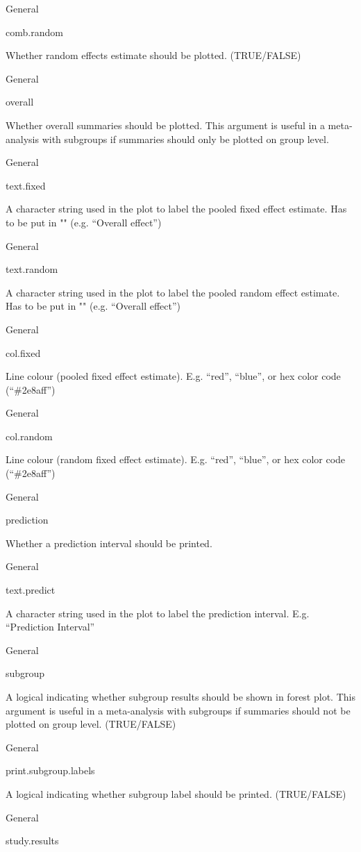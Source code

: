 \documentclass[]{book}
\begin{document}
General

comb.random

Whether random effects estimate should be plotted. (TRUE/FALSE)

General

overall

Whether overall summaries should be plotted. This argument is useful in a meta-analysis with subgroups if summaries should only be plotted on group level.

General

text.fixed

A character string used in the plot to label the pooled fixed effect estimate. Has to be put in "" (e.g. ``Overall effect'')

General

text.random

A character string used in the plot to label the pooled random effect estimate. Has to be put in "" (e.g. ``Overall effect'')

General

col.fixed

Line colour (pooled fixed effect estimate). E.g. ``red'', ``blue'', or hex color code (``\#2e8aff'')

General

col.random

Line colour (random fixed effect estimate). E.g. ``red'', ``blue'', or hex color code (``\#2e8aff'')

General

prediction

Whether a prediction interval should be printed.

General

text.predict

A character string used in the plot to label the prediction interval. E.g. ``Prediction Interval''

General

subgroup

A logical indicating whether subgroup results should be shown in forest plot. This argument is useful in a meta-analysis with subgroups if summaries should not be plotted on group level. (TRUE/FALSE)

General

print.subgroup.labels

A logical indicating whether subgroup label should be printed. (TRUE/FALSE)

General

study.results
\end{document}
